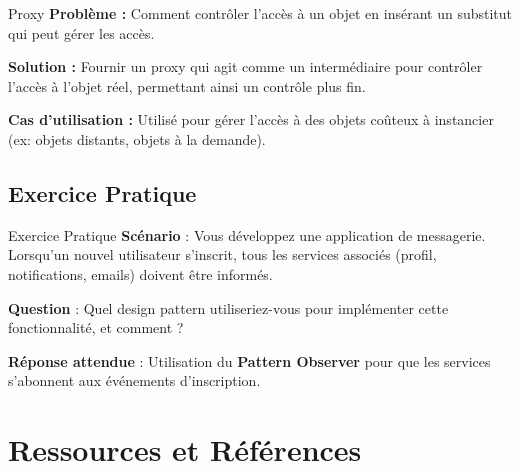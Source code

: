 \documentclass[aspectratio=169]{beamer}
\begin{document}
\begin{frame}{Proxy}
    \textbf{Problème :} 
    Comment contrôler l'accès à un objet en insérant un substitut qui peut gérer les accès.

    \textbf{Solution :} 
    Fournir un proxy qui agit comme un intermédiaire pour contrôler l'accès à l'objet réel, permettant ainsi un contrôle plus fin.

    \textbf{Cas d'utilisation :}
    Utilisé pour gérer l'accès à des objets coûteux à instancier (ex: objets distants, objets à la demande).
\end{frame}

\subsection{Exercice Pratique}

\begin{frame}{Exercice Pratique}
    \textbf{Scénario} : Vous développez une application de messagerie. Lorsqu'un nouvel utilisateur s'inscrit, tous les services associés (profil, notifications, emails) doivent être informés.

    \vspace{0.5cm}

    \textbf{Question} : Quel design pattern utiliseriez-vous pour implémenter cette fonctionnalité, et comment ?

    \vspace{0.5cm}

    \pause

    \textbf{Réponse attendue} : Utilisation du \textbf{Pattern Observer} pour que les services s'abonnent aux événements d'inscription.
\end{frame}


\section{Ressources et Références}
\end{document}
